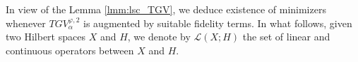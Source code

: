 \documentclass[a4paper,11pt,oneside,notitlepage]{article}
\newtheorem{proposition}[theorem]{Proposition}
\numberwithin{equation}{section}
\def\R{\mathbb{R}}
\def\ker{{\rm ker}}
\newcommand{\vphi}{\varphi}
\begin{document}

\color{black}
In view of the Lemma \ref{lmm:lsc_TGV}, we deduce existence of minimizers whenever $TGV^{\vphi,2}_\alpha$ is augmented by suitable fidelity terms. In what follows, given two Hilbert spaces $X$ and $H$, we denote by $\mathcal{L}(X;H)$ the set of linear and continuous operators between $X$ and $H$.
\end{document}

